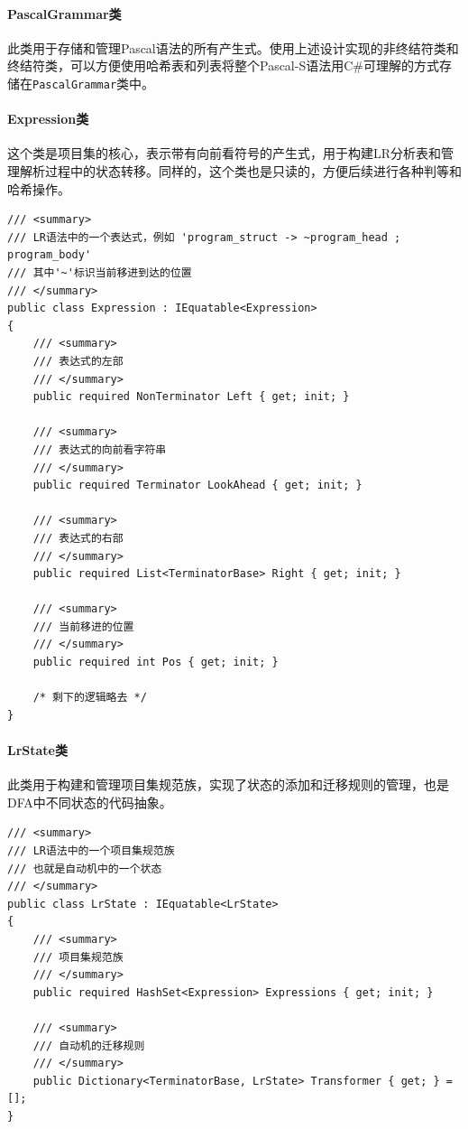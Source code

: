 \documentclass[../main.tex]{subfiles}
\begin{document}
\paragraph{PascalGrammar类} 此类用于存储和管理Pascal语法的所有产生式。使用上述设计实现的非终结符类和终结符类，可以方便使用哈希表和列表将整个Pascal-S语法用C\#可理解的方式存储在\texttt{PascalGrammar}类中。

\paragraph{Expression类} 这个类是项目集的核心，表示带有向前看符号的产生式，用于构建LR分析表和管理解析过程中的状态转移。同样的，这个类也是只读的，方便后续进行各种判等和哈希操作。

\begin{lstlisting}[style=csharp]
/// <summary>
/// LR语法中的一个表达式，例如 'program_struct -> ~program_head ; program_body'
/// 其中'~'标识当前移进到达的位置
/// </summary>
public class Expression : IEquatable<Expression>
{
    /// <summary>
    /// 表达式的左部
    /// </summary>
    public required NonTerminator Left { get; init; }

    /// <summary>
    /// 表达式的向前看字符串
    /// </summary>
    public required Terminator LookAhead { get; init; }

    /// <summary>
    /// 表达式的右部
    /// </summary>
    public required List<TerminatorBase> Right { get; init; }

    /// <summary>
    /// 当前移进的位置
    /// </summary>
    public required int Pos { get; init; } 

    /* 剩下的逻辑略去 */
}
\end{lstlisting}

\paragraph{LrState类} 此类用于构建和管理项目集规范族，实现了状态的添加和迁移规则的管理，也是DFA中不同状态的代码抽象。

\begin{lstlisting}[style=csharp]
/// <summary>
/// LR语法中的一个项目集规范族
/// 也就是自动机中的一个状态
/// </summary>
public class LrState : IEquatable<LrState>
{
    /// <summary>
    /// 项目集规范族
    /// </summary>
    public required HashSet<Expression> Expressions { get; init; }

    /// <summary>
    /// 自动机的迁移规则
    /// </summary>
    public Dictionary<TerminatorBase, LrState> Transformer { get; } = [];
}
\end{lstlisting}
\end{document}
